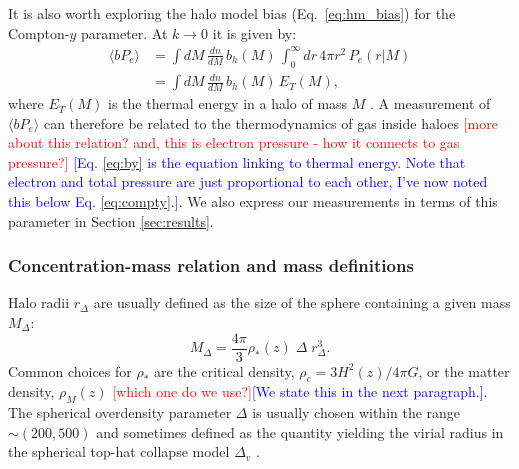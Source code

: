 \documentclass[useAMS,usenatbib]{mn2e}
\newcommand{\MB}[1]{\textcolor{red}{#1}}
\newcommand{\DA}[1]{\textcolor{blue}{#1}}
\begin{document}
      It is also worth exploring the halo model bias (Eq.\!~\ref{eq:hm_bias}) for the Compton-$y$ parameter. At $k\rightarrow0$ it is given by:
      \begin{align}\nonumber
        \langle bP_e\rangle&=\int dM\,\frac{dn}{dM}\,b_h(M)\,\int_0^\infty dr\,4\pi r^2\,P_e(r|M)\\\label{eq:by}
               &=\int dM\,\frac{dn}{dM}\,b_h(M)\,E_T(M),
      \end{align}
      where $E_T(M)$ is the thermal energy in a halo of mass $M$ \citep{2017MNRAS.467.2315V,2019arXiv190413347P}. A measurement of $\langle bP_e\rangle$ can therefore be related to the thermodynamics of gas inside haloes \MB{[more about this relation? and, this is electron pressure - how it connects to gas pressure?]} \DA{[Eq. \ref{eq:by} is the equation linking to thermal energy. Note that electron and total pressure are just proportional to each other, I've now noted this below Eq. \ref{eq:compty}.]}. We also express our measurements in terms of this parameter in Section \ref{sec:results}.
      
    \subsubsection{Concentration-mass relation and mass definitions}\label{sssec:theory.hm.cm}
      Halo radii $r_\Delta$ are usually defined as the size of the sphere containing a given mass $M_\Delta$:
      \begin{equation}
        M_\Delta = \frac{4\pi}{3}\rho_*(z) \; \Delta \; r^3_\Delta.
      \end{equation}
      Common choices for $\rho_*$ are the critical density, $\rho_c=3H^2(z)/4\pi G$, or the matter density, $\rho_M(z)$ \MB{[which one do we use?]}\DA{[We state this in the next paragraph.]}. The spherical overdensity parameter $\Delta$ is usually chosen within the range $\sim(200,500)$ and sometimes defined as the quantity yielding the virial radius in the spherical top-hat collapse model $\Delta_v$ \citep{1998ApJ...495...80B}.
\end{document}
